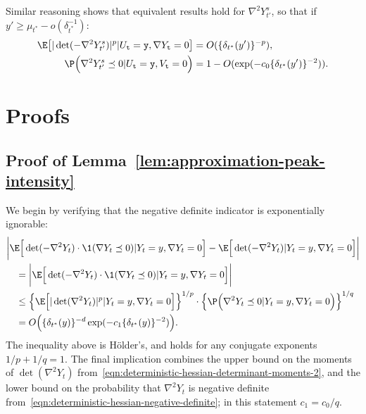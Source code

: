 \documentclass{article}
\begin{document}
	Similar reasoning shows that equivalent results hold for $\nabla^2 Y_{t'}^s$, so that if $y' \geq \mu_{t^*} - o(\delta_{t^*}^{-1})$:
	\begin{equation}
		\label{eqn:randomized-kac-rice-hessian-moments-2}
		\begin{aligned}
			\E\big[|\det(-\nabla^2 Y_{t'}^s)|^p|U_{{\tt t}} = {\tt y},\nabla Y_{{\tt t}} = 0\big] 
			& = 
			O(\{\delta_{t^*}(y')\}^{-p}),  \\
			\P\Big(\nabla^2 Y_{t'}^s \preceq  0|U_{{\tt t}} = {\tt y}, V_{{\tt t}} = 0\Big) 
			& = 
			1 - O(\exp(-c_0\{\delta_{t^*}(y')\}^{-2})).
		\end{aligned}
	\end{equation}
	
	\section{Proofs}
	
	\subsection{Proof of Lemma~\ref{lem:approximation-peak-intensity}}
	\label{subsec:pf-approximation-peak-intensity}
	We begin by verifying that the negative definite indicator is exponentially ignorable:
	\begin{equation}
		\label{pf:approximation-peak-intensity-1}
		\begin{aligned}
			& \bigg|\E\Big[\det(-\nabla^2 Y_t) \cdot \1(\nabla Y_t \preceq 0)|Y_t = y,\nabla Y_t = 0\Big] - \E\Big[\det(-\nabla^2 Y_t)|Y_t = y,\nabla Y_t = 0\Big]\bigg| \\
			& \quad = \bigg|\E\Big[\det(-\nabla^2 Y_t) \cdot \1(\nabla Y_t \preceq 0)|Y_t = y,\nabla Y_t = 0\Big]\bigg| \\
			& \quad \leq \Big\{\E\Big[|\det(\nabla^2 Y_t)|^{p}|Y_t = y,\nabla Y_t = 0\Big]\Big\}^{1/p} \cdot \Big\{\P\Big(\nabla^2 Y_t \preceq 0|Y_t = y,\nabla Y_t = 0\Big)\Big\}^{1/q} \\
			& \quad = O\Big(\{\delta_{t^*}(y)\}^{-d} \exp(-c_1 \{\delta_{t^*}(y)\}^{-2})\Big).
		\end{aligned}
	\end{equation}
	The inequality above is H\"{o}lder's, and holds for any conjugate exponents $1/p + 1/q = 1$. The final implication combines the upper bound on the moments of $\det(\nabla^2 Y_t)$ from~\eqref{eqn:deterministic-hessian-determinant-moments-2}, and the lower bound on the probability that $\nabla^2 Y_t$ is negative definite from~\eqref{eqn:deterministic-hessian-negative-definite}; in this statement $c_1 = c_0/q$. 
	
\end{document}
